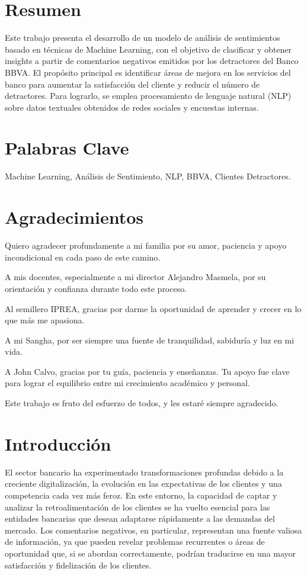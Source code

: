 \documentclass{matematicasud}
\begin{document}
\maketitle

\section*{Resumen}
Este trabajo presenta el desarrollo de un modelo de análisis de sentimientos basado en técnicas de Machine Learning, con el objetivo de clasificar y obtener insights a partir de comentarios negativos emitidos por los detractores del Banco BBVA. El propósito principal es identificar áreas de mejora en los servicios del banco para aumentar la satisfacción del cliente y reducir el número de detractores. Para lograrlo, se emplea procesamiento de lenguaje natural (NLP) sobre datos textuales obtenidos de redes sociales y encuestas internas.

\section*{Palabras Clave}
Machine Learning, Análisis de Sentimiento, NLP, BBVA, Clientes Detractores.

\section*{Agradecimientos}
Quiero agradecer profundamente a mi familia por su amor, paciencia y apoyo incondicional en cada paso de este camino. 

A mis docentes, especialmente a mi director Alejandro Masmela, por su orientación y confianza durante todo este proceso.

Al semillero IPREA, gracias por darme la oportunidad de aprender y crecer en lo que más me apasiona.

A mi Sangha, por ser siempre una fuente de tranquilidad, sabiduría y luz en mi vida.

A John Calvo, gracias por tu guía, paciencia y enseñanzas. Tu apoyo fue clave para lograr el equilibrio entre mi crecimiento académico y personal.

Este trabajo es fruto del esfuerzo de todos, y les estaré siempre agradecido.


\newpage

\tableofcontents
\newpage
\section{Introducción}
El sector bancario ha experimentado transformaciones profundas debido a la creciente digitalización, la evolución en las expectativas de los clientes y una competencia cada vez más feroz. En este entorno, la capacidad de captar y analizar la retroalimentación de los clientes se ha vuelto esencial para las entidades bancarias que desean adaptarse rápidamente a las demandas del mercado. Los comentarios negativos, en particular, representan una fuente valiosa de información, ya que pueden revelar problemas recurrentes o áreas de oportunidad que, si se abordan correctamente, podrían traducirse en una mayor satisfacción y fidelización de los clientes.
\end{document}

